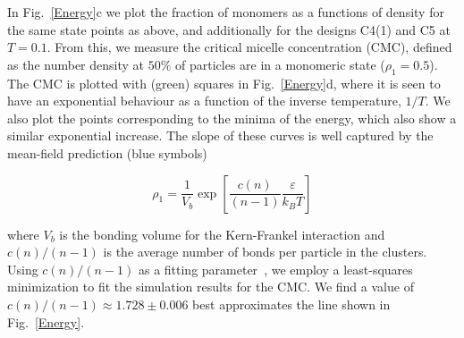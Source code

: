 \documentclass[a4paper, amsfonts, amssymb, amsmath, reprint, showkeys, nofootinbib, oneside]{revtex4-1}
\begin{document}
In Fig.~\ref{Energy}c we plot the fraction of monomers as a functions of density for the same state points as above, and additionally for the designs C4(1) and C5 at $T=0.1$.
From this, we measure the critical micelle concentration (CMC), defined as the number density at $50\%$ of particles are in a monomeric state ($\rho_1=0.5$). The CMC is plotted with (green) squares in Fig.~\ref{Energy}d, where it is seen to have an exponential behaviour as a function of the inverse temperature, $1/T$. We also plot the points corresponding to the minima of the energy, which also show a similar exponential increase. The slope of these curves is well captured by 
the mean-field prediction (blue symbols)~\cite{Kraft2012}

\begin{equation}\label{meanfield}
\rho_1=\frac{1}{V_b}\exp[\frac{c(n)}{(n-1)} \frac{\varepsilon}{k_B T}]
\end{equation}



\noindent where $V_b$ is the bonding volume for the Kern-Frankel interaction and $c(n)/(n-1)$ is the average number of bonds per particle in the clusters. Using $c(n)/(n-1)$ as a fitting parameter~\cite{Hatch2016}, we employ a least-squares minimization to fit the simulation results for the CMC. We find a value of $c(n)/(n-1)\approx 1.728\pm 0.006$ best approximates the line shown in Fig.~\ref{Energy}.




\end{document}
